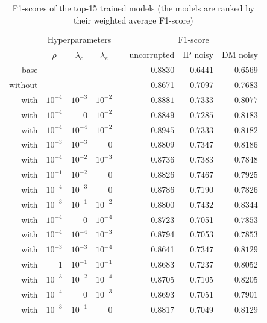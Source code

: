 \begin{table}\centering
{}
\begin{tabular}{@{}rrrrcrrr@{}}\toprule
& \multicolumn{3}{c}{Hyperparameters} & \phantom{abc}& \multicolumn{3}{c}{F1-score}\\
\cmidrule{2-4} \cmidrule{6-8}
& \multicolumn{1}{c}{$\rho$} & \multicolumn{1}{c}{$\lambda_c$} & \multicolumn{1}{c}{$\lambda_e$} && \multicolumn{1}{r}{uncorrupted} & \multicolumn{1}{r}{IP noisy} & \multicolumn{1}{r}{DM noisy}\\ \midrule\midrule
base & & & && 0.8830 & 0.6441 & 0.6569\\
without & & & && 0.8671& 0.7097& 0.7683\\\midrule
with & $10^{-4}$ & $10^{-3}$ & $10^{-2}$ && $\mathbf{0.8881}$& $\mathbf{0.7333}$& $\mathbf{0.8077}$\\
with & $10^{-4}$ & $0$ & $10^{-2}$ && $\mathbf{0.8849}$& $\mathbf{0.7285}$& $\mathbf{0.8183}$\\
with & $10^{-4}$ & $10^{-4}$ & $10^{-2}$ && $\mathbf{0.8945}$& $\mathbf{0.7333}$& $\mathbf{0.8182}$\\
with & $10^{-3}$ & $10^{-3}$ & $0$ && 0.8809& $\mathbf{0.7347}$& $\mathbf{0.8186}$\\
with & $10^{-4}$ & $10^{-2}$ & $10^{-3}$ && 0.8736& $\mathbf{0.7383}$& $\mathbf{0.7848}$\\
with & $10^{-1}$ & $10^{-2}$ & $0$ && 0.8826& $\mathbf{0.7467}$& $\mathbf{0.7925}$\\
with & $10^{-4}$ & $10^{-3}$ & $0$ && 0.8786& $\mathbf{0.7190}$& $\mathbf{0.7826}$\\
with & $10^{-3}$ & $10^{-1}$ & $10^{-2}$ && 0.8800& $\mathbf{0.7432}$& $\mathbf{0.8344}$\\
with & $10^{-4}$ & $0$ & $10^{-4}$ && 0.8723& 0.7051& $\mathbf{0.7853}$\\
with & $10^{-4}$ & $10^{-4}$ & $10^{-3}$ && 0.8794& 0.7053& $\mathbf{0.7853}$\\
with & $10^{-3}$ & $10^{-3}$ & $10^{-4}$ && 0.8641& $\mathbf{0.7347}$& $\mathbf{0.8129}$\\
with & $1$ & $10^{-1}$ & $10^{-1}$ && 0.8683& $\mathbf{0.7237}$& $\mathbf{0.8052}$\\
with & $10^{-3}$ & $10^{-2}$ & $10^{-4}$ && 0.8705& $\mathbf{0.7105}$& $\mathbf{0.8205}$\\
with & $10^{-4}$ & $0$ & $10^{-3}$ && 0.8693& 0.7051& $\mathbf{0.7901}$\\
with & $10^{-3}$ & $10^{-1}$ & $0$ && 0.8817& 0.7049& $\mathbf{0.8129}$\\
\bottomrule
\end{tabular}
\caption{F1-scores of the top-15 trained models (the models are ranked by their weighted average F1-score)}
\label{tab:results}
\end{table}

